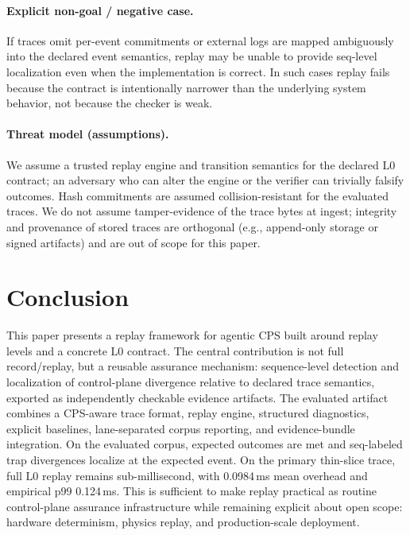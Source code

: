 \documentclass[11pt]{article}
\newcommand{\Lzero}{\ensuremath{\mathrm{L0}}}
\begin{document}
\paragraph{Explicit non-goal / negative case.}
If traces omit per-event commitments or external logs are mapped ambiguously into the declared event semantics, replay may be unable to provide seq-level localization even when the implementation is correct. In such cases replay fails because the contract is intentionally narrower than the underlying system behavior, not because the checker is weak.

\paragraph{Threat model (assumptions).}
We assume a trusted replay engine and transition semantics for the declared \Lzero{} contract; an adversary who can alter the engine or the verifier can trivially falsify outcomes. Hash commitments are assumed collision-resistant for the evaluated traces. We do not assume tamper-evidence of the trace bytes at ingest; integrity and provenance of stored traces are orthogonal (e.g., append-only storage or signed artifacts) and are out of scope for this paper.

\section{Conclusion}

This paper presents a replay framework for agentic CPS built around replay levels and a concrete \Lzero{} contract. The central contribution is not full record/replay, but a reusable assurance mechanism: sequence-level detection and localization of control-plane divergence relative to declared trace semantics, exported as independently checkable evidence artifacts. The evaluated artifact combines a CPS-aware trace format, replay engine, structured diagnostics, explicit baselines, lane-separated corpus reporting, and evidence-bundle integration. On the evaluated corpus, expected outcomes are met and seq-labeled trap divergences localize at the expected event. On the primary thin-slice trace, full \Lzero{} replay remains sub-millisecond, with 0.0984\,ms mean overhead and empirical p99 0.124\,ms. This is sufficient to make replay practical as routine control-plane assurance infrastructure while remaining explicit about open scope: hardware determinism, physics replay, and production-scale deployment.

\appendix
\end{document}
